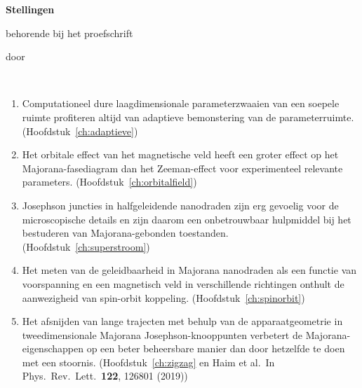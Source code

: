 \documentclass{dissertation}
\begin{document}
\clearpage
{

\begin{center}

{\Large\titlefont\bfseries Stellingen}

\smallskip

behorende bij het proefschrift

\smallskip

{\makeatletter
\titlestyle\bfseries\large\@title
\makeatother}

{\makeatletter
\ifx\@subtitle\undefined\else
    \titlefont\titleshape\@subtitle
\fi
\makeatother}

\smallskip

door

\smallskip

\makeatletter
{\large\titlefont\bfseries\@firstname\ {\titleshape\@lastname}}
\makeatother

\end{center}

\begin{enumerate}
\itemsep-0.08em

\item Computationeel dure laagdimensionale parameterzwaaien van een soepele ruimte profiteren altijd van adaptieve bemonstering van de parameterruimte. (Hoofdstuk~\ref{ch:adaptieve})

\item Het orbitale effect van het magnetische veld heeft een groter effect op het Majorana-fasediagram dan het Zeeman-effect voor experimenteel relevante parameters. (Hoofdstuk~\ref{ch:orbitalfield})

\item Josephson juncties in halfgeleidende nanodraden zijn erg gevoelig voor de microscopische details en zijn daarom een onbetrouwbaar hulpmiddel bij het bestuderen van Majorana-gebonden toestanden. (Hoofdstuk~\ref{ch:superstroom})

\item Het meten van de geleidbaarheid in Majorana nanodraden als een functie van voorspanning en een magnetisch veld in verschillende richtingen onthult de aanwezigheid van spin-orbit koppeling. (Hoofdstuk~\ref{ch:spinorbit})

\item Het afsnijden van lange trajecten met behulp van de apparaatgeometrie in tweedimensionale Majorana Josephson-knooppunten verbetert de Majorana-eigenschappen op een beter beheersbare manier dan door hetzelfde te doen met een stoornis. (Hoofdstuk~\ref{ch:zigzag} en Haim et al.~In Phys.~Rev.~Lett.~\textbf{122}, 126801 (2019))


\end{enumerate}}
\end{document}
